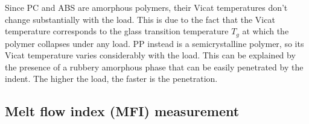 \documentclass[a4paper, 11pt]{article}
\begin{document}
Since PC and ABS are amorphous polymers, their Vicat temperatures don't change substantially with the load. This is due to the fact that the Vicat temperature corresponds to the glass transition temperature $T_{g}$ at which the polymer collapses under any load.
PP instead is a semicrystalline polymer, so its Vicat temperature varies considerably with the load. This can be explained by the presence of a rubbery amorphous phase that can be easily penetrated by the indent. The higher the load, the faster is the penetration.

\newpage

\subsection{Melt flow index (MFI) measurement}
\end{document}
